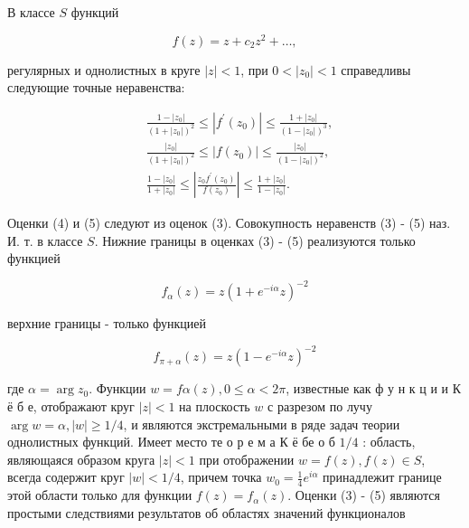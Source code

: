 \documentclass[10pt]{article}
\begin{document}
В классе $S$ функций



\[

f(z)=z+c_{2} z^{2}+\ldots,

\]



регулярных и однолистных в круге $|z|<1$, при $0<\left|z_{0}\right|<1$ справедливы следующие точные неравенства:



\[

\begin{aligned}

& \frac{1-\left|z_{0}\right|}{\left(1+\left|z_{0}\right|\right)^{2}} \leqslant\left|f^{\prime}\left(z_{0}\right)\right| \leqslant \frac{1+\left|z_{0}\right|}{\left(1-\left|z_{0}\right|\right)^{3}}, \\

& \frac{\left|z_{0}\right|}{\left(1+\left|z_{0}\right|\right)^{2}} \leqslant\left|f\left(z_{0}\right)\right| \leqslant \frac{\left|z_{0}\right|}{\left(1-\left|z_{0}\right|\right)^{2}}, \\

& \frac{1-\left|z_{0}\right|}{1+\left|z_{0}\right|} \leqslant\left|\frac{z_{0} f^{\prime}\left(z_{0}\right)}{f\left(z_{0}\right)}\right| \leqslant \frac{1+\left|z_{0}\right|}{1-\left|z_{0}\right|} .

\end{aligned}

\]



Оценки (4) и (5) следуют из оценок (3). Совокупность неравенств (3) - (5) наз. И. т. в классе $S$. Нижние границы в оценках (3) - (5) реализуются только функцией



\[

f_{\alpha}(z)=z\left(1+e^{-i \alpha} z\right)^{-2}

\]



верхние границы - только функцией



\[

f_{\pi+\alpha}(z)=z\left(1-e^{-i \alpha} z\right)^{-2}

\]



где $\alpha=\arg z_{0}$. Функции $w=f \alpha(z), 0 \leqslant \alpha<2 \pi$, известные как ф у н к ц и и К ё б е, отображают круг $|z|<1$ на плоскость $w$ с разрезом по лучу $\arg w=\alpha,|w| \geqslant 1 / 4$, и являются экстремальными в ряде задач теории однолистных функций. Имеет место те о р е м а К ё бе о б $1 / 4$ : область, являющаяся образом круга $|z|<1$ при отображении $w=f(z), f(z) \in S$, всегда содержит круг $|w|<1 / 4$, причем точка $w_{0}=\frac{1}{4} e^{i \alpha}$ принадлежит границе этой области только для функции $f(z)=f_{\alpha}(z)$. Оценки (3) - (5) являются простыми следствиями результатов об областях значений функционалов
\end{document}
